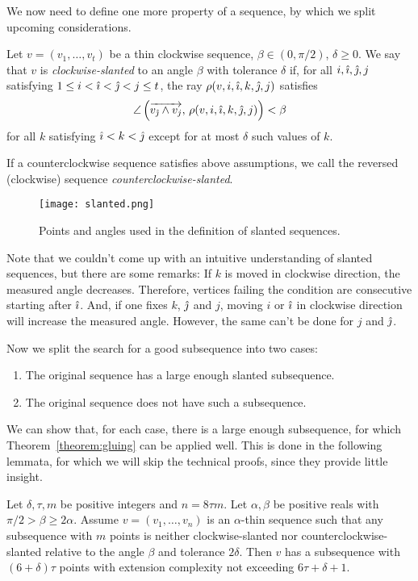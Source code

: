 We now need to define one more property of a sequence, by which we split upcoming considerations.

\begin{definition}
  Let $v=(v_1,\ldots,v_t)$ be a thin clockwise sequence, ${\beta\in(0,\pi/2)}$, $\delta\geq 0$.
  We say that $v$ is \emph{clockwise-slanted} to an angle $\beta$ with tolerance $\delta$ if, for all $i, \mathcal{\hat{\imath}}, \mathcal{\hat{\jmath}}, j$ satisfying $1 \leq i < \mathcal{\hat{\imath}} < \mathcal{\hat{\jmath}} < j \leq t$, the ray ${\rho}(v, i, \mathcal{\hat{\imath}}, k, \mathcal{\hat{\jmath}}, j)$ satisfies
  $$\angle \left( \overrightarrow{v_{\mathcal{\hat{\jmath}}} \wedge v_j},\,\rho(v, i, \mathcal{\hat{\imath}}, k, \mathcal{\hat{\jmath}}, j) \right) < \beta$$
  for all $k$ satisfying $\mathcal{\hat{\imath}} < k < \mathcal{\hat{\jmath}}$ except for at most $\delta$ such values of $k$.

  If a counterclockwise sequence satisfies above assumptions, we call the reversed (clockwise) sequence \emph{counterclockwise-slanted}.
\end{definition}

\begin{figure}[ht]
  \centering
  \texttt{[image: slanted.png]}
  \caption{Points and angles used in the definition of slanted sequences.}
  \label{fig:slanted}
\end{figure}

Note that we couldn't come up with an intuitive understanding of slanted sequences, but there are some remarks: If $k$ is moved in clockwise direction, the measured angle decreases. Therefore, vertices failing the condition are consecutive starting after $\mathcal{\hat{\imath}}$. And, if one fixes $k$, $\mathcal{\hat{\jmath}}$ and $j$, moving $i$ or $\mathcal{\hat{\imath}}$ in clockwise direction will increase the measured angle. However, the same can't be done for $j$ and $\mathcal{\hat{\jmath}}$.

Now we split the search for a good subsequence into two cases:
\begin{enumerate}
  \item The original sequence has a large enough slanted subsequence.
  \item The original sequence does not have such a subsequence.
\end{enumerate}

We can show that, for each case, there is a large enough subsequence, for which Theorem~\ref{theorem:gluing} can be applied well. This is done in the following lemmata, for which we will skip the technical proofs, since they provide little insight.

\begin{lemma}\label{lemma:unslanted-subseqence}
  Let $\delta, \tau, m$ be positive integers and $n=8\tau m$. Let $\alpha,\beta$ be positive reals with $\pi/2>\beta\geq 2\alpha$. Assume $v=(v_1,\dots,v_n)$ is an $\alpha$-thin sequence such that any subsequence with $m$ points is neither clockwise-slanted nor counterclockwise-slanted relative to the angle $\beta$ and tolerance $2\delta$. Then $v$ has a subsequence with $(6+\delta)\tau$ points with extension complexity not exceeding $6\tau+\delta+1$.
\end{lemma}

